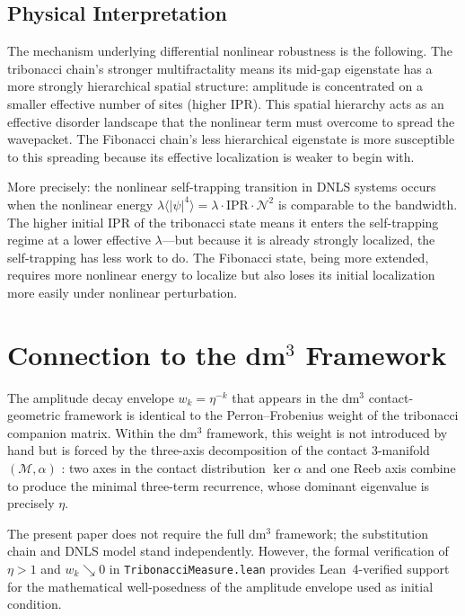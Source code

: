 \documentclass[12pt,a4paper]{article}
\begin{document}
\subsection{Physical Interpretation}

The mechanism underlying differential nonlinear robustness is the following.
The tribonacci chain's stronger multifractality means its mid-gap eigenstate
has a more strongly hierarchical spatial structure: amplitude is concentrated
on a smaller effective number of sites (higher IPR). This spatial hierarchy
acts as an effective disorder landscape that the nonlinear term must overcome
to spread the wavepacket. The Fibonacci chain's less hierarchical eigenstate
is more susceptible to this spreading because its effective localization is
weaker to begin with.

More precisely: the nonlinear self-trapping transition in DNLS systems occurs
when the nonlinear energy $\lambda \langle |\psi|^4 \rangle = \lambda \cdot
\mathrm{IPR} \cdot \mathcal{N}^2$ is comparable to the bandwidth. The higher
initial IPR of the tribonacci state means it enters the self-trapping regime
at a lower effective $\lambda$---but because it is already strongly localized,
the self-trapping has less work to do. The Fibonacci state, being more
extended, requires more nonlinear energy to localize but also loses its initial
localization more easily under nonlinear perturbation.

\section{Connection to the dm$^3$ Framework}

The amplitude decay envelope $w_k = \eta^{-k}$ that appears in the dm$^3$
contact-geometric framework \cite{Grossi2026_Vol1,Grossi2026_Wavenumber6}
is identical to the Perron--Frobenius weight of the tribonacci companion
matrix. Within the dm$^3$ framework, this weight is not introduced by hand
but is forced by the three-axis decomposition of the contact 3-manifold
$(\mathcal{M}, \alpha)$ \cite{Grossi2026_Vol1,Grossi2026_Tribonacci}: two
axes in the contact distribution $\ker\alpha$ and one Reeb axis combine to
produce the minimal three-term recurrence, whose dominant eigenvalue is
precisely $\eta$.

The present paper does not require the full dm$^3$ framework; the substitution
chain and DNLS model stand independently. However, the formal verification of
$\eta > 1$ and $w_k \searrow 0$ in \texttt{TribonacciMeasure.lean}
\cite{AXLE2026} provides Lean~4-verified support for the mathematical
well-posedness of the amplitude envelope used as initial condition.
\end{document}
